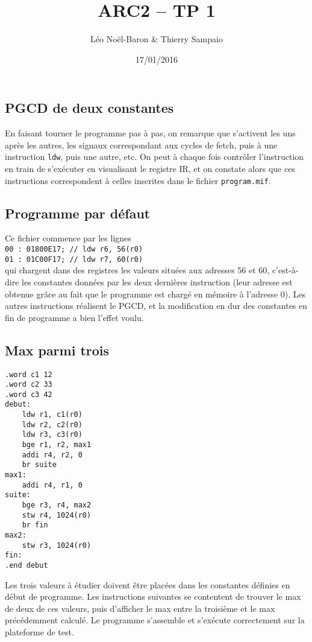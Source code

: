 \documentclass[a4paper,11pt]{article}
\title{ARC2 -- TP 1}
\author{Léo Noël-Baron \& Thierry Sampaio}
\date{17/01/2016}
\begin{document}
\maketitle

\subsection*{PGCD de deux constantes}

En faisant tourner le programme pas à pas, on remarque que s'activent les uns après les autres, les signaux correspondant aux cycles de fetch, puis à une instruction \verb?ldw?, puis une autre, etc. On peut à chaque fois contrôler l'instruction en train de s'exécuter en visualisant le registre IR, et on constate alors que ces instructions correspondent à celles inscrites dans le fichier \verb?program.mif?.

\subsection*{Programme par défaut}

Ce fichier commence par les lignes\\
\verb?00 : 01800E17; // ldw r6, 56(r0)?\\
\verb?01 : 01C00F17; // ldw r7, 60(r0)?\\
qui chargent dans des registres les valeurs situées aux adresses 56 et 60, c'est-à-dire les constantes données par les deux dernières instruction (leur adresse est obtenue grâce au fait que le programme est chargé en mémoire à l'adresse 0). Les autres instructions réalisent le PGCD, et la modification en dur des constantes en fin de programme a bien l'effet voulu.

\subsection*{Max parmi trois}

\begin{verbatim}
.word c1 12
.word c2 33
.word c3 42
debut:
    ldw r1, c1(r0)
    ldw r2, c2(r0)
    ldw r3, c3(r0)
    bge r1, r2, max1
    addi r4, r2, 0
    br suite
max1:
    addi r4, r1, 0
suite:
    bge r3, r4, max2
    stw r4, 1024(r0)
    br fin
max2:
    stw r3, 1024(r0)
fin:
.end debut
\end{verbatim}
Les trois valeurs à étudier doivent être placées dans les constantes définies en début de programme. Les instructions suivantes se contentent de trouver le max de deux de ces valeurs, puis d'afficher le max entre la troisième et le max précédemment calculé. Le programme s'assemble et s'exécute correctement sur la plateforme de test.
\end{document}

